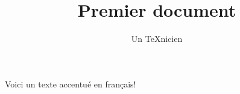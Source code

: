 \documentclass{article}
\title{Premier document}
\author{Un TeXnicien}
\date{}
\begin{document}
  \maketitle
  
  Voici un texte accentué en français!
  
  
\end{document}

